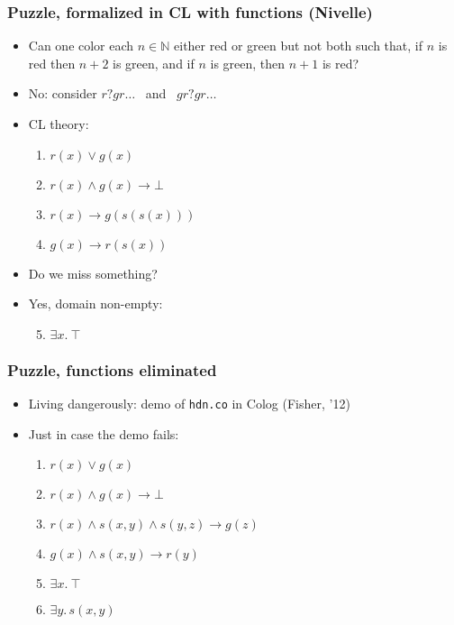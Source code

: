 \documentclass[handout,11pt]{beamer}
\newcommand{\nat}{\mathbb{N}}
\newcommand{\imp}{\rightarrow}
\begin{document}
\begin{frame}
\frametitle{Puzzle, formalized in CL with functions (Nivelle)} 
 \begin{itemize}[<+->]
     \item Can one color each
     $n\in\nat$ either red or green but not both such that, if $n$ is red
          then $n{+}2$ is green, and if  $n$ is green, then $n{+}1$ is red?
    \item No: consider $r?gr\ldots$~ and~ $gr?gr\ldots$
    \item CL theory:
    \begin{enumerate}
       \item $r(x) \vee g(x)$ 
       \item $r(x) \wedge g(x) \imp \bot$
       \item $r(x) \imp g(s(s(x)))$ 
       \item $g(x) \imp r(s(x))$
     \end{enumerate}
   \item Do we miss something?
   \item Yes, domain non-empty: 
    \begin{enumerate}       
       \setcounter{enumi}{4}       
       \item $\exists x.~\top$
    \end{enumerate}
 \end{itemize}
\end{frame}

\begin{frame}
\frametitle{Puzzle, functions eliminated}
 \begin{itemize}[<+->]
    \item Living dangerously: demo of {\tt hdn.co} in Colog (Fisher, '12)
    \item Just in case the demo fails:
    \begin{enumerate}
      \item $r(x) \vee g(x)$ 
      \item $r(x) \wedge g(x) \imp \bot$
      \item $r(x) \wedge s(x,y) \wedge s(y,z) \imp g(z)$ 
      \item $g(x) \wedge s(x,y) \imp r(y)$    
      \item $\exists x.~\top$
      \item $\exists y.\,s(x,y)$
  \end{enumerate}
   \end{itemize}
\end{frame}
\end{document}
